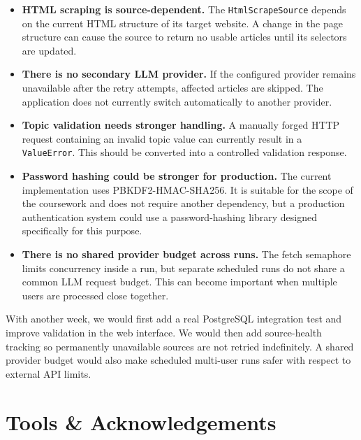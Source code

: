 \documentclass[11pt,a4paper]{article}
\begin{document}
\begin{itemize}
\setlength\itemsep{0.4em}

\item
\textbf{HTML scraping is source-dependent.}
The \texttt{HtmlScrapeSource} depends on the current HTML structure of its target website. A change in the page structure can cause the source to return no usable articles until its selectors are updated.

\item
\textbf{There is no secondary LLM provider.}
If the configured provider remains unavailable after the retry attempts, affected articles are skipped. The application does not currently switch automatically to another provider.

\item
\textbf{Topic validation needs stronger handling.}
A manually forged HTTP request containing an invalid topic value can currently result in a \texttt{ValueError}. This should be converted into a controlled validation response.

\item
\textbf{Password hashing could be stronger for production.}
The current implementation uses PBKDF2-HMAC-SHA256. It is suitable for the scope of the coursework and does not require another dependency, but a production authentication system could use a password-hashing library designed specifically for this purpose.

\item
\textbf{There is no shared provider budget across runs.}
The fetch semaphore limits concurrency inside a run, but separate scheduled runs do not share a common LLM request budget. This can become important when multiple users are processed close together.

\end{itemize}

With another week, we would first add a real PostgreSQL integration test and improve validation in the web interface. We would then add source-health tracking so permanently unavailable sources are not retried indefinitely. A shared provider budget would also make scheduled multi-user runs safer with respect to external API limits.

\section{Tools \& Acknowledgements}\label{sec:tools}
\end{document}

